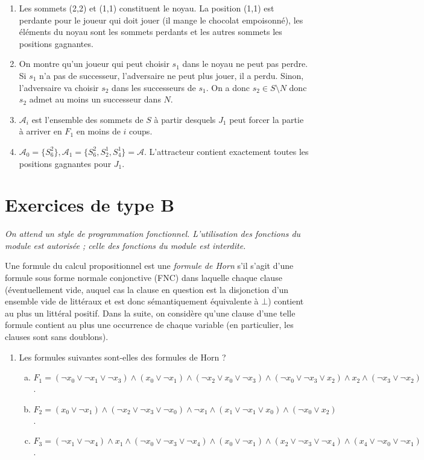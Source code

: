 \documentclass{ccinp}
\begin{document}
\begin{enumerate}
\item Les sommets (2,2) et (1,1) constituent le noyau. La position (1,1) est perdante pour le joueur qui doit jouer (il mange le chocolat empoisonné), les éléments du noyau sont les sommets perdants et les autres sommets les positions gagnantes.
\item On montre qu’un joueur qui peut choisir $s_1$ dans le noyau ne peut pas perdre. Si $s_1$ n’a pas de successeur, l’adversaire ne peut plus jouer, il a perdu. Sinon, l’adversaire va choisir $s_2$ dans les successeurs de $s_1$. On a donc $s_2\in S\setminus N$ donc $s_2$ admet au moins un successeur dans $N$.
\item $\mathcal A_{i}$ est l'ensemble des sommets de $S$ à partir desquels $J_1$ peut forcer la partie à arriver en $F_1$ en moins de $i$ coups. 
\item $\mathcal A_0 = \{S_6^2\}, \mathcal A_1 = \{S_6^2,S_2^1,S_4^1\}=\mathcal A$. L'attracteur contient  exactement toutes les positions gagnantes pour $J_1$.
\end{enumerate}

\newpage
\section*{Exercices de type B}



\preambuleocaml \textit{On attend un style de programmation fonctionnel. L'utilisation des fonctions du module  est autorisée ; celle des fonctions du module  est interdite.}

Une formule du calcul propositionnel est une \textit{formule de Horn} s'il s'agit d'une formule sous forme normale conjonctive (FNC) dans laquelle chaque clause (éventuellement vide, auquel cas la clause en question est la disjonction d'un ensemble vide de littéraux et est donc sémantiquement équivalente à $\bot$) contient au plus un littéral positif. Dans la suite, on considère qu'une clause d'une telle formule contient au plus une occurrence de chaque variable (en particulier, les clauses sont sans doublons).

\begin{enumerate}
    \item Les formules suivantes sont-elles des formules de Horn ? \begin{enumerate}[a)]
        \item $F_1 = (\neg x_0 \lor \neg x_1 \lor \neg x_3) \wedge (x_0 \lor \neg x_1) \wedge (\neg x_2 \lor x_0 \lor \neg x_3) \wedge (\neg x_0 \lor \neg x_3 \lor x_2) \wedge x_2 \wedge (\neg x_3 \lor \neg x_2)$.
        \item $F_2 = (x_0 \lor \neg x_1) \wedge (\neg x_2 \lor \neg x_3 \lor \neg x_0) \wedge \neg x_1 \wedge (x_1 \lor \neg x_1 \lor x_0) \wedge (\neg x_0 \lor x_2)$.
        \item $F_3 = (\neg x_1 \lor \neg x_4) \wedge x_1 \wedge (\neg x_0 \lor \neg x_3 \lor \neg x_4) \wedge (x_0 \lor \neg x_1) \wedge (x_2 \lor \neg x_3 \lor \neg x_4) \wedge (x_4 \lor \neg x_0 \lor \neg x_1)$.
    \end{enumerate}
\end{enumerate}
\end{document}
